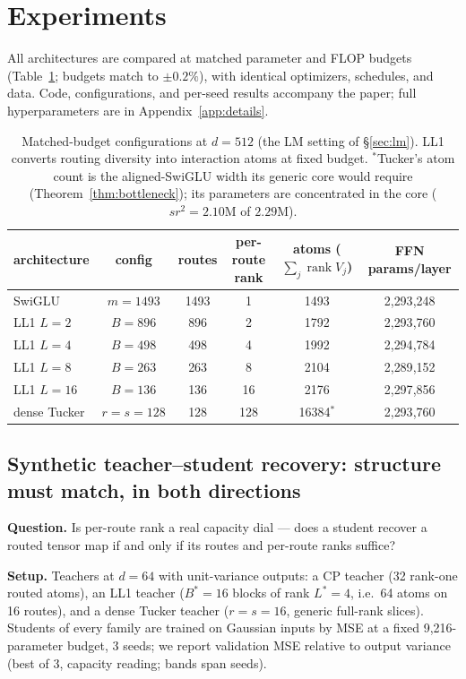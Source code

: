 \documentclass[11pt]{article}
\DeclareMathOperator{\rank}{rank}
\begin{document}
\section{Experiments}
\label{sec:experiments}

All architectures are compared at matched parameter and FLOP budgets
(Table~\ref{tab:configs}; budgets match to $\pm 0.2\%$), with identical optimizers,
schedules, and data. Code, configurations, and per-seed results accompany the paper;
full hyperparameters are in Appendix~\ref{app:details}.

\begin{table}[t]
\centering
\small
\begin{tabular}{lccccc}
\toprule
architecture & config & routes & per-route rank & atoms ($\sum_j \rank V_j$) & FFN params/layer \\
\midrule
SwiGLU & $m{=}1493$ & 1493 & 1 & 1493 & 2{,}293{,}248 \\
LL1 $L{=}2$ & $B{=}896$ & 896 & 2 & 1792 & 2{,}293{,}760 \\
LL1 $L{=}4$ & $B{=}498$ & 498 & 4 & 1992 & 2{,}294{,}784 \\
LL1 $L{=}8$ & $B{=}263$ & 263 & 8 & 2104 & 2{,}289{,}152 \\
LL1 $L{=}16$ & $B{=}136$ & 136 & 16 & 2176 & 2{,}297{,}856 \\
dense Tucker & $r{=}s{=}128$ & 128 & 128 & 16384$^*$ & 2{,}293{,}760 \\
\bottomrule
\end{tabular}
\caption{Matched-budget configurations at $d=512$ (the LM setting of
\S\ref{sec:lm}). LL1 converts routing diversity into interaction atoms at fixed
budget. $^*$Tucker's atom count is the aligned-SwiGLU width its generic core would
require (Theorem~\ref{thm:bottleneck}); its parameters are concentrated in the core
($sr^2 = 2.10$M of $2.29$M).}
\label{tab:configs}
\end{table}

\subsection{Synthetic teacher--student recovery: structure must match, in both directions}
\label{sec:synthetic}

\textbf{Question.} Is per-route rank a real capacity dial — does a student recover a
routed tensor map if and only if its routes and per-route ranks suffice?

\textbf{Setup.} Teachers at $d=64$ with unit-variance outputs: a CP teacher (32
rank-one routed atoms), an LL1 teacher ($B^*{=}16$ blocks of rank $L^*{=}4$, i.e.\ 64
atoms on 16 routes), and a dense Tucker teacher ($r{=}s{=}16$, generic full-rank
slices). Students of every family are trained on Gaussian inputs by MSE at a fixed
9{,}216-parameter budget, 3 seeds; we report validation MSE relative to output
variance (best of 3, capacity reading; bands span seeds).
\end{document}
